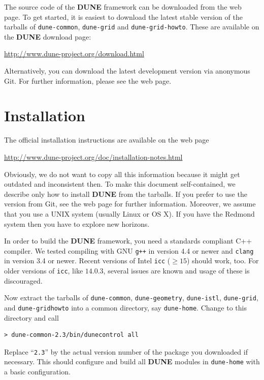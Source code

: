 \documentclass[11pt,a4paper,headinclude,footinclude,DIV16,headings=normal]{scrreprt}
\newcommand{\Dune}{{\sffamily\bfseries DUNE}\xspace}
\begin{document}
The source code of the \Dune{} framework can be
downloaded from the web page.  To get started, it is easiest to
download the latest stable version of the tarballs of
\texttt{dune-common}, \texttt{dune-grid} and \texttt{dune-grid-howto}.
These are available on the \Dune{} download page:
%
\begin{center}
\url{http://www.dune-project.org/download.html}
\end{center}
%

Alternatively, you can download the latest development version via
anonymous Git.  For further information, please see the web page.

\section{Installation}

The official installation instructions are available on the web page
%
\begin{center}
\url{http://www.dune-project.org/doc/installation-notes.html}
\end{center}

Obviously, we do not want to copy all this information because it might
get outdated and inconsistent then. To make this document
self-contained, we describe only how to install \Dune{} from the
tarballs.  If you prefer to use the version from Git, see the web page
for further information.  Moreover, we assume that you use a UNIX
system (usually Linux or OS X). If you have the Redmond system then
you have to explore new horizons.

In order to build the \Dune{} framework, you need a standards
compliant C++ compiler.  We tested compiling with GNU \texttt{g++} in
version 4.4 or newer and \texttt{clang} in version 3.4 or newer. Recent versions
of Intel \texttt{icc} ($\geq 15$) should work, too. For older versions of
\texttt{icc}, like $14.0.3$, several issues are known and usage of these
is discouraged.

Now extract the tarballs of \texttt{dune-common},
\texttt{dune-geometry}, \texttt{dune-istl}, \texttt{dune-grid},
and \texttt{dune-grid\-howto} into a common directory, say
\texttt{dune-home}.  Change to this directory and call
\begin{lstlisting}
> dune-common-2.3/bin/dunecontrol all
\end{lstlisting}
Replace ``\texttt{2.3}'' by the actual version number of the package
you downloaded if necessary.  This should configure and build all
\Dune{} modules in \texttt{dune-home} with a basic configuration.
\end{document}
